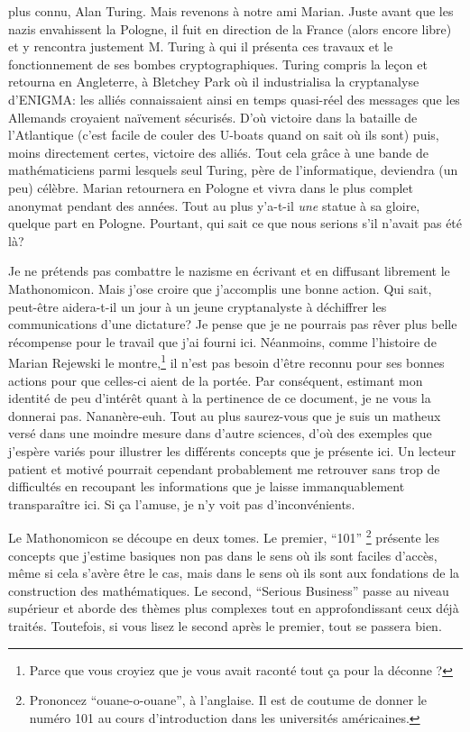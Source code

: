 plus connu, Alan Turing. Mais revenons à notre ami Marian. Juste avant
que les nazis envahissent la Pologne, il fuit en direction de la
France (alors encore libre) et y rencontra justement M. Turing à qui
il présenta ces travaux et le fonctionnement de ses bombes
cryptographiques. Turing compris la leçon et retourna en Angleterre, à
Bletchey Park où il industrialisa la cryptanalyse d'ENIGMA: les alliés
connaissaient ainsi en temps quasi-réel des messages que les Allemands
croyaient naïvement sécurisés. D'où victoire dans la bataille de
l'Atlantique (c'est facile de couler des U-boats quand on sait où ils
sont) puis, moins directement certes, victoire des alliés. Tout cela
grâce à une bande de mathématiciens parmi lesquels seul Turing, père
de l'informatique, deviendra (un peu) célèbre. Marian retournera en
Pologne et vivra dans le plus complet anonymat pendant des
années. Tout au plus y'a-t-il \emph{une} statue à sa gloire, quelque
part en Pologne. Pourtant, qui sait ce que nous serions s'il n'avait
pas été là?

Je ne prétends pas combattre le nazisme en écrivant et en diffusant
librement le Mathonomicon. Mais j'ose croire que j'accomplis une bonne
action. Qui sait, peut-être aidera-t-il un jour à un jeune
cryptanalyste à déchiffrer les communications d'une dictature? Je
pense que je ne pourrais pas rêver plus belle récompense pour le
travail que j'ai fourni ici.  Néanmoins, comme l'histoire de Marian
Rejewski le montre,\footnote{Parce que vous croyiez que je vous avait
  raconté tout ça pour la déconne ?} il n'est pas besoin d'être
reconnu pour ses bonnes actions pour que celles-ci aient de la
portée. Par conséquent, estimant mon identité de peu d'intérêt quant à
la pertinence de ce document, je ne vous la donnerai
pas. Nananère-euh. Tout au plus saurez-vous que je suis un matheux
versé dans une moindre mesure dans d'autre sciences, d'où des exemples
que j'espère variés pour illustrer les différents concepts que je
présente ici. Un lecteur patient et motivé pourrait cependant
probablement me retrouver sans trop de difficultés en recoupant les
informations que je laisse immanquablement transparaître ici. Si ça
l'amuse, je n'y voit pas d'inconvénients.


Le Mathonomicon se découpe en deux tomes. Le premier, ``101''
\footnote{Prononcez ``ouane-o-ouane'', à l'anglaise. Il est de coutume
  de donner le numéro 101 au cours d'introduction dans les universités
  américaines.} présente les concepts que j'estime basiques non pas
dans le sens où ils sont faciles d'accès, même si cela s'avère être le
cas, mais dans le sens où ils sont aux fondations de la construction
des mathématiques. Le second, ``Serious Business'' passe au niveau
supérieur et aborde des thèmes plus complexes tout en approfondissant
ceux déjà traités. Toutefois, si vous lisez le second après le
premier, tout se passera bien.

